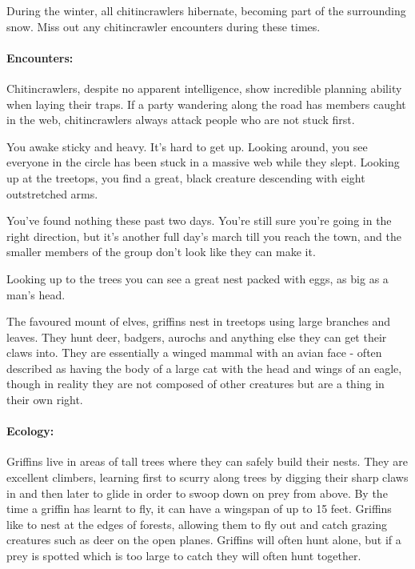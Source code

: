 \begin{multicols}{2}
During the winter, all chitincrawlers hibernate, becoming part of the surrounding snow.  Miss out any chitincrawler encounters during these times.

\paragraph{Encounters:} Chitincrawlers, despite no apparent intelligence, show incredible planning ability when laying their traps.  If a party wandering along the road has members caught in the web, chitincrawlers always attack people who are not stuck first.

\begin{boxtext}

You awake sticky and heavy.
It's hard to get up.
Looking around, you see everyone in the circle has been stuck in a massive web while they slept.
Looking up at the treetops, you find a great, black creature descending with eight outstretched arms.

\end{boxtext}

\label{griffin}

\begin{boxtext}

	You've found nothing these past two days.  You're still sure you're going in the right direction, but it's another full day's march till you reach the town, and the smaller members of the group don't look like they can make it.

	Looking up to the trees you can see a great nest packed with eggs, as big as a man's head.

\end{boxtext}

The favoured mount of elves, griffins nest in treetops using large branches and leaves.  They hunt deer, badgers, aurochs and anything else they can get their claws into.  They are essentially a winged mammal with an avian face - often described as having the body of a large cat with the head and wings of an eagle, though in reality they are not composed of other creatures but are a thing in their own right.


\paragraph{Ecology:} Griffins live in areas of tall trees where they can safely build their nests.  They are excellent climbers, learning first to scurry along trees by digging their sharp claws in and then later to glide in order to swoop down on prey from above.  By the time a griffin has learnt to fly, it can have a wingspan of up to 15 feet.  Griffins like to nest at the edges of forests, allowing them to fly out and catch grazing creatures such as deer on the open planes.  Griffins will often hunt alone, but if a prey is spotted which is too large to catch  they will often hunt together.


\end{multicols}
